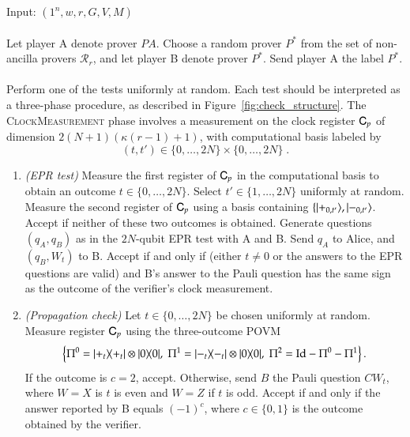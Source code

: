 \vspace{10pt}
\begin{center}
\begin{mdframed}
    Input: $(1^n,w,r,G,V,M)$ \\
    \\
	Let player A denote prover $PA$.
    Choose a random prover $P^*$ from the set of non-ancilla provers $\mathcal{R}_r$, and let player B denote prover $P^*$. Send player A the label $P^*$. \\
    \\
    Perform one of the tests uniformly at random. Each test should be interpreted as a three-phase procedure, as described in Figure~\ref{fig:check_structure}. The \textsc{ClockMeasurement} phase involves a measurement on the clock register ${\textsf{C}}_p$ of dimension $2(N+1)(\kappa(r-1)+1)$, with computational basis labeled by 
    \[
    (t,t')\in \{0,\ldots,2N\} \times \{0,\ldots,2N\}\; .
    \]
    
	\begin{enumerate}
 \item \emph{(EPR test)} Measure the first register of ${\textsf{C}}_{p}$ in the computational basis to obtain an outcome $t\in\{0,\ldots,2N\}$. Select $t'\in\{1,\ldots,2N\}$ uniformly at random. Measure the second register of ${\textsf{C}}_{p}$ using a basis containing $\{|+_{0,t'}\rangle,|-_{0,t'}\rangle$. Accept if neither of these two outcomes is obtained. Generate questions $(q_A,q_B)$ as in the $2N$-qubit EPR test with A and B. Send $q_A$ to Alice, and $(q_B,W_t)$ to B. Accept if and only if (either $t\neq 0$ or the answers to the EPR questions are valid) and B's answer to the Pauli question has the same sign as the outcome of the verifier's clock measurement.\\

\item \emph{(Propagation check)} Let $t\in\{0,\ldots,2N\}$ be chosen uniformly at random. Measure register ${\textsf{C}}_{p}$ using the three-outcome POVM
$$\left\{ \Pi^0 =  |+_t\rangle\!\langle+_t| \otimes |0\rangle\!\langle0|,\; \Pi^1 =  |-_t\rangle\!\langle-_t| \otimes |0\rangle\!\langle0|,\;\Pi^2 = \mathop{\mathrm{Id}}\!\mathinner{} - \Pi^0-\Pi^1 \right\}.$$
If the outcome is $c=2$, accept. Otherwise, send $B$ the Pauli question $CW_{t}$, where $W=X$ is $t$ is even and $W=Z$ if $t$ is odd. Accept if and only if the answer reported by B equals $(-1)^c$, where $c\in\{0,1\}$ is the outcome obtained by the verifier.


\end{enumerate}
\end{mdframed}
\end{center}
